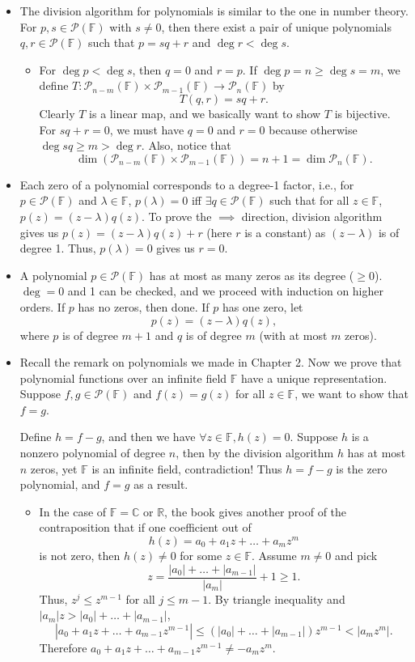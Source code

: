 \documentclass{article}
\newcommand{\R}{\mathbb{R}}
\newcommand{\C}{\mathbb{C}}
\newcommand{\F}{\mathbb{F}}
\renewcommand{\d}{\dim}
\newcommand{\PF}{\mathcal{P}(\F)}
\begin{document}
\begin{itemize}
    \item The division algorithm for polynomials is similar to the one in number theory. For $p,s \in \mathcal{P}(\F)$ with $s \not= 0$, then there exist a pair of unique polynomials $q,r \in \mathcal{P}(\F)$ such that $p=sq+r$ and $\deg r < \deg s$.
    \begin{itemize}
        \item For $\deg p < \deg s$, then $q = 0$ and $r = p$. If $\deg p = n \geq \deg s = m$, we define $T: \mathcal{P}_{n-m}(\F) \times \mathcal{P}_{m-1}(\F) \to \mathcal{P}_n(\F)$ by $$T(q,r) = sq+r.$$
        Clearly $T$ is a linear map, and we basically want to show $T$ is bijective. For $sq+r=0$, we must have $q=0$ and $r=0$ because otherwise $\deg sq \geq m > \deg r$. Also, notice that $$\d(\mathcal{P}_{n-m}(\F) \times \mathcal{P}_{m-1}(\F)) = n+1 = \d \mathcal{P}_n(\F).$$
    \end{itemize}
    \item Each zero of a polynomial corresponds to a degree-1 factor, i.e., for $p \in \PF$ and $\lambda \in \F$, $p(\lambda) = 0$ iff $\exists q \in \PF$ such that for all $z \in \F$, $p(z) = (z-\lambda)q(z)$. To prove the $\implies$ direction, division algorithm gives us $p(z) = (z-\lambda)q(z) + r$ (here $r$ is a constant) as $(z-\lambda)$ is of degree 1. Thus, $p(\lambda) = 0$ gives us $r=0$.
    
    \item A polynomial $p \in \PF$ has at most as many zeros as its degree ($\geq 0$). $\deg = 0$ and 1 can be checked, and we proceed with induction on higher orders. If $p$ has no zeros, then done. If $p$ has one zero, let $$p(z) = (z-\lambda)q(z),$$ where $p$ is of degree $m+1$ and $q$ is of degree $m$ (with at most $m$ zeros).
    
    \item Recall the remark on polynomials we made in Chapter 2. Now we prove that polynomial functions over an infinite field $\F$ have a unique representation. Suppose $f,g \in \PF$ and $f(z)=g(z)$ for all $z \in \F$, we want to show that $f=g$.
    
    Define $h = f-g$, and then we have $\forall z\in\F, h(z) = 0$. Suppose $h$ is a nonzero polynomial of degree $n$, then by the division algorithm $h$ has at most $n$ zeros, yet $\F$ is an infinite field, contradiction! Thus $h = f-g$ is the zero polynomial, and $f = g$ as a result.
    
    \begin{itemize}
        \item In the case of $\F = \C$ or $\R$, the book gives another proof of the contraposition that if one coefficient out of $$h(z) = a_0+a_1z+\dots+a_mz^m$$ is not zero, then $h(z) \not= 0$ for some $z \in \F$. Assume $m \not= 0$ and pick $$z = \frac{|a_0| + \dots + |a_{m-1}|}{|a_m|}+1 \geq 1.$$ Thus, $z^j \leq z^{m-1}$ for all $j \leq m-1$. By triangle inequality and $|a_m|z > |a_0|+ \dots + |a_{m-1}|$, $$|a_0+a_1z+\dots+a_{m-1}z^{m-1}| \leq (|a_0|+\dots+|a_{m-1}|)z^{m-1}< |a_m z^m|.$$ Therefore $a_0+a_1z+\dots+a_{m-1}z^{m-1} \not= -a_m z^m$.
    \end{itemize}
    

\end{itemize}
\end{document}
